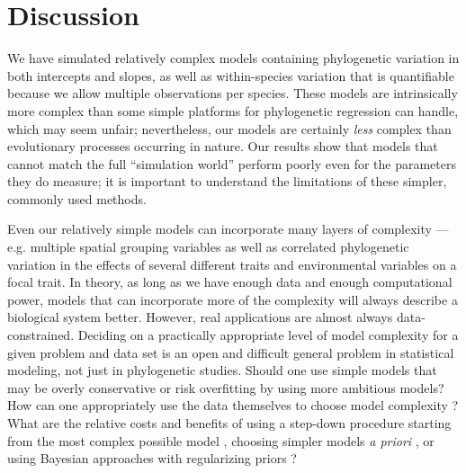 \documentclass[12pt]{article}
\begin{document}

\newpage

\section*{Discussion}



We have simulated relatively complex models containing phylogenetic variation in both intercepts and slopes, as well as within-species variation that is quantifiable because we allow multiple observations per species.
These models are intrinsically more complex than some simple platforms for phylogenetic regression can handle, which may seem unfair; nevertheless, our models are certainly \emph{less} complex than evolutionary processes occurring in nature.
Our results show that models that cannot match the full ``simulation world'' perform poorly even for the parameters they do measure; it is important to understand the limitations of these simpler, commonly used methods.

Even our relatively simple models can incorporate many layers of complexity --- e.g. multiple spatial grouping variables as well as correlated phylogenetic variation in the effects of several different traits and environmental variables on a focal trait.
In theory, as long as we have enough data and enough computational power, models that can incorporate more of the complexity will always describe a biological system better.
However, real applications are almost always data-constrained.
Deciding on a practically appropriate level of model complexity for a given
problem and data set is an
open and difficult general problem in statistical modeling, not just
in phylogenetic studies.
Should one use simple models that may be overly conservative or
risk overfitting by using more ambitious models?
How can one appropriately use the data themselves
to choose model complexity \cite{roberts_cross-validation_2016}?
What are the relative costs and benefits of using a step-down procedure
starting from the most complex possible model \citep{barr2013random},
choosing simpler models \emph{a priori} \citep{baayen2008mixed},
or using Bayesian approaches with regularizing priors \citep{hadfield2010mcmc}?
\end{document}
